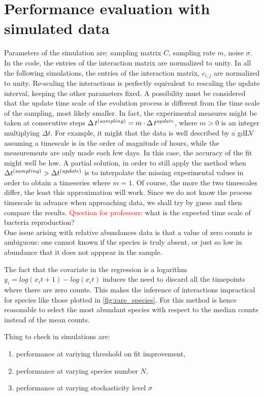 \section{Performance evaluation with simulated data}
Parameters of the simulation are: sampling matrix $C$, sampling rate $m$, noise $\sigma$.
In the code, the entries of the interaction matrix are normalized to unity. In all the following simulations, the entries of the interaction matrix, $c_{i,j}$ are normalized to unity. Re-scaling the interactions is perfectly equivalent to rescaling the update interval, keeping the other parameters fixed.
A possibility must be considered that the update time scale of the evolution process is different from the time scale of the sampling, most likely smaller. In fact, the experimental measures might be taken at consecutive steps $\Delta\,t^{\small (sampling)} = m\cdot \Delta\, t^{\small update}$, where $m > 0$ is an integer multiplying $\Delta t$. For example, it might that the data is well described by a gdLV assuming a timescale is in the order of magnitude of hours, while the measurements are only made each few days. In this case, the accuracy of the fit might well be low. A partial solution, in order to still apply the method when $\Delta t^{(\small sampling)} > \Delta t^{(\small update)}$ is to interpolate the missing experimental values in order to obtain a timeseries where $m = 1$. Of course, the more the two timescales differ, the least this approximation will work. Since we do not know the process timescale in advance when approaching data, we shall try by guess and then compare the results. \textcolor{red}{Question for professors:} what is the expected time scale of bacteria reproduction?
\\

One issue arising with relative abundances data is that a value of zero counts is ambiguous: one cannot known if the species is truly absent, or just so low in abundance that it does not apppear in the sample. 

The fact that the covariate in the regression is a logarithm $y_i = log(x_i t +1) - log(x_i t)$ induces the need to discard all the timepoints where there are zero counts. This makes the inference of interactions impractical for species like those plotted in \ref{fig:rare_species}. For this method is hence reasonable to select the most abundant species with respect to the median counts instead of the mean counts.

Thing to check in simulations are:

\begin{enumerate}
    \item performance at variying threshold on fit improvement,
    \item performance at varying species number $N$,
    \item performance at varying stochasticity level $\sigma$
\end{enumerate}



